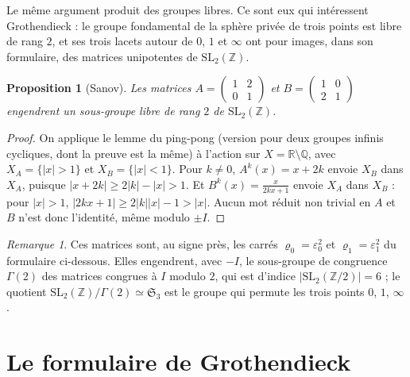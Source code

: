\documentclass[11pt,a4paper]{article}
\theoremstyle{plain}
\newtheorem{proposition}[theoreme]{Proposition}
\theoremstyle{definition}
\theoremstyle{remark}
\newtheorem{remarque}[theoreme]{Remarque}
\newcommand{\Z}{\mathbb{Z}}
\newcommand{\Q}{\mathbb{Q}}
\newcommand{\R}{\mathbb{R}}
\newcommand{\SL}{\mathrm{SL}}
\begin{document}
Le même argument produit des groupes libres. Ce sont eux qui intéressent Grothendieck : le groupe fondamental de la sphère privée de trois points est libre de rang $2$, et ses trois lacets autour de $0$, $1$ et $\infty$ ont pour images, dans son formulaire, des matrices unipotentes de $\SL_2(\Z)$.

\begin{proposition}[Sanov]\label{prop:sanov}
Les matrices $A=\begin{pmatrix}1&2\\0&1\end{pmatrix}$ et $B=\begin{pmatrix}1&0\\2&1\end{pmatrix}$ engendrent un sous-groupe libre de rang $2$ de $\SL_2(\Z)$.
\end{proposition}

\begin{proof}
On applique le lemme du ping-pong (version pour deux groupes infinis cycliques, dont la preuve est la même) à l'action sur $X=\R\setminus\Q$, avec $X_A=\{|x|>1\}$ et $X_B=\{|x|<1\}$. Pour $k\neq0$, $A^k(x)=x+2k$ envoie $X_B$ dans $X_A$, puisque $|x+2k|\geq2|k|-|x|>1$. Et $B^k(x)=\frac x{2kx+1}$ envoie $X_A$ dans $X_B$ : pour $|x|>1$, $|2kx+1|\geq2|k||x|-1>|x|$. Aucun mot réduit non trivial en $A$ et $B$ n'est donc l'identité, même modulo $\pm I$.
\end{proof}

\begin{remarque}
Ces matrices sont, au signe près, les carrés $\varrho_0=\varepsilon_0^2$ et $\varrho_1=\varepsilon_1^2$ du formulaire ci-dessous. Elles engendrent, avec $-I$, le sous-groupe de congruence $\Gamma(2)$ des matrices congrues à $I$ modulo $2$, qui est d'indice $|\SL_2(\Z/2)|=6$ ; le quotient $\SL_2(\Z)/\Gamma(2)\simeq\mathfrak S_3$ est le groupe qui permute les trois points $0$, $1$, $\infty$.
\end{remarque}

\section{Le formulaire de Grothendieck}\label{sec:formulaire}
\end{document}
